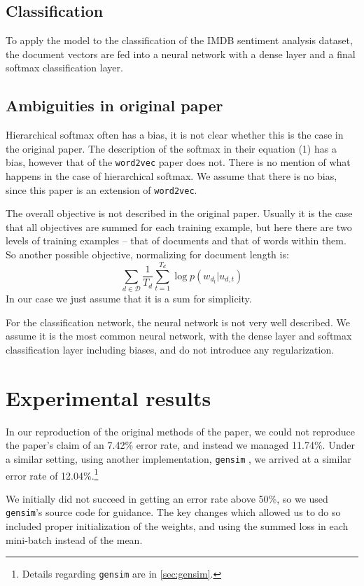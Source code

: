 \documentclass{article}
\begin{document}
\subsection{Classification}
To apply the model to the classification of the IMDB sentiment analysis dataset, the document vectors are fed into a neural network with a dense layer and a final softmax classification layer.

\subsection{Ambiguities in original paper}
Hierarchical softmax often has a bias, it is not clear whether this is the case in the original paper. The description of the softmax in their equation (1) has a bias, however that of the \texttt{word2vec} paper does not. There is no mention of what happens in the case of hierarchical softmax. We assume that there is no bias, since this paper is an extension of \texttt{word2vec}.

The overall objective is not described in the original paper. Usually it is the case that all objectives are summed for each training example, but here there are two levels of training examples -- that of documents and that of words within them. So another possible objective, normalizing for document length is:
    \[\sum_{d\in\mathcal{D}}\frac{1}{T_d}\sum_{t=1}^{T_d} \log p(w_{d_t}|u_{d,t})\]
In our case we just assume that it is a sum for simplicity.

For the classification network, the neural network is not very well described. We assume it is the most common neural network, with the dense layer and softmax classification layer including biases, and do not introduce any regularization.

\section{Experimental results}
In our reproduction of the original methods of the paper, we could not reproduce the paper's claim of an 7.42\% error rate, and instead we managed 11.74\%. Under a similar setting, using another implementation, \texttt{gensim} \citep{rehurek_software_2010}, we arrived at a similar error rate of 12.04\%.\footnote{Details regarding \texttt{gensim} are in \autoref{sec:gensim}.}

We initially did not succeed in getting an error rate above 50\%, so we used \texttt{gensim}'s source code for guidance. The key changes which allowed us to do so included proper initialization of the weights, and using the summed loss in each mini-batch instead of the mean.
\end{document}
